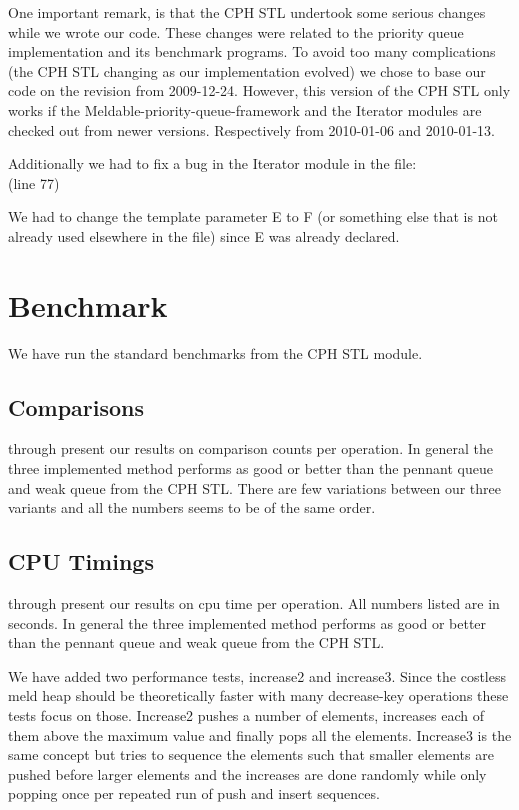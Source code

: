 \documentclass{DIKU-article}[2010/01/13]
\newcommand{\code}[1]{{\small\texttt{#1}}}
\begin{document}
One important remark, is that the CPH STL undertook some serious
changes while we wrote our code. These changes were related to the
priority queue implementation and its benchmark programs. To avoid too
many complications (the CPH STL changing as our implementation
evolved) we chose to base our code on the revision from
2009-12-24. However, this version of the CPH STL only works if the
Meldable-priority-queue-framework and the Iterator modules are checked
out from newer versions. Respectively from 2010-01-06 and 2010-01-13.

Additionally we had to fix a bug in the Iterator module in the file:\\
\indent \code{Iterator/Code/priority-queue-iterator.h++} (line 77)

We had to change the template parameter E to F (or something else that
is not already used elsewhere in the file) since E was already
declared.


\section{Benchmark}

We have run the standard benchmarks from the CPH STL module.

\subsection{Comparisons}
 through  present our results
on comparison counts per operation. In general the three implemented
method performs as good or better than the pennant queue and weak
queue from the CPH STL. There are few variations between our three
variants and all the numbers seems to be of the same order.

\subsection{CPU Timings}
 through  present our results
on cpu time per operation. All numbers listed are in seconds. In
general the three implemented method performs as good or better than
the pennant queue and weak queue from the CPH STL.


We have added two performance tests, increase2 and increase3. Since the costless
meld heap should be theoretically faster with many decrease-key operations these
tests focus on those. Increase2 pushes a number of elements, increases each of
them above the maximum value and finally pops all the elements. Increase3 is the
same concept but tries to sequence the elements such that smaller elements are
pushed before larger elements and the increases are done randomly while only
popping once per repeated run of push and insert sequences.
\end{document}
